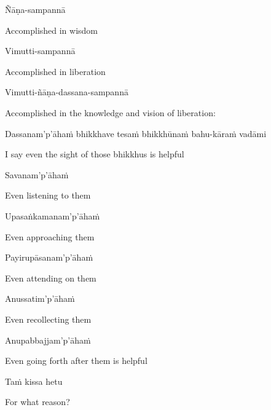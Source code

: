 Ñāṇa-sampannā

\begin{english}
  Accomplished in wisdom
\end{english}

Vimutti-sampannā

\begin{english}
  Accomplished in liberation
\end{english}

Vimutti-ñāṇa-dassana-sampannā

\begin{english}
  Accomplished in the knowledge and vision of liberation:
\end{english}

\begin{pali-hang}
  Dassanam'p'āhaṁ bhikkhave tesaṁ bhikkhūnaṁ bahu-kāraṁ vadāmi
\end{pali-hang}

\begin{english}
  I say even the sight of those bhikkhus is helpful
\end{english}

Savanam'p'āhaṁ

\begin{english}
  Even listening to them
\end{english}

Upasaṅkamanam'p'āhaṁ

\begin{english}
  Even approaching them
\end{english}

Payirupāsanam'p'āhaṁ

\begin{english}
  Even attending on them
\end{english}

Anussatim'p'āhaṁ

\begin{english}
  Even recollecting them
\end{english}

Anupabbajjam'p'āhaṁ

\begin{english}
  Even going forth after them is helpful
\end{english}

\ifninebythirteen\clearpage\fi

Taṁ kissa hetu

\begin{english}
  For what reason?
\end{english}

